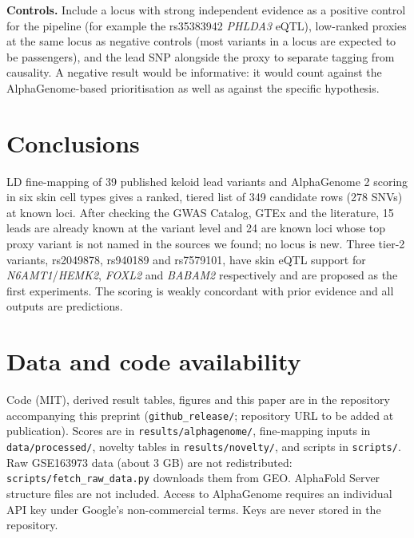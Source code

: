 \documentclass[10pt,twocolumn,a4paper]{article}
\begin{document}
\textbf{Controls.} Include a locus with strong independent evidence as a positive control for the pipeline (for example the rs35383942 \emph{PHLDA3} eQTL), low-ranked proxies at the same locus as negative controls (most variants in a locus are expected to be passengers), and the lead SNP alongside the proxy to separate tagging from causality. A negative result would be informative: it would count against the AlphaGenome-based prioritisation as well as against the specific hypothesis.

\section{Conclusions}

LD fine-mapping of 39 published keloid lead variants and AlphaGenome 2 scoring in six skin cell types gives a ranked, tiered list of 349 candidate rows (278 SNVs) at known loci. After checking the GWAS Catalog, GTEx and the literature, 15 leads are already known at the variant level and 24 are known loci whose top proxy variant is not named in the sources we found; no locus is new. Three tier-2 variants, rs2049878, rs940189 and rs7579101, have skin eQTL support for \emph{N6AMT1}/\emph{HEMK2}, \emph{FOXL2} and \emph{BABAM2} respectively and are proposed as the first experiments. The scoring is weakly concordant with prior evidence and all outputs are predictions.

\section{Data and code availability}

Code (MIT), derived result tables, figures and this paper are in the repository accompanying this preprint (\texttt{github\_release/}; repository URL to be added at publication). Scores are in \texttt{results/alphagenome/}, fine-mapping inputs in \texttt{data/processed/}, novelty tables in \texttt{results/novelty/}, and scripts in \texttt{scripts/}. Raw GSE163973 data (about 3 GB) are not redistributed: \texttt{scripts/fetch\_raw\_data.py} downloads them from GEO. AlphaFold Server structure files are not included. Access to AlphaGenome requires an individual API key under Google's non-commercial terms. Keys are never stored in the repository.
\end{document}
